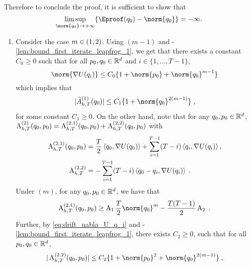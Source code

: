 Therefore to conclude the proof, it is sufficient to show that
\begin{equation}
\label{eq:drift_uhmc_minus1}
\limsup_{\norm{\q_0} \to \plusinfty} \defEnsLigne{\Eproof(\q_0) - \norm{\q_0}} = - \infty.
\end{equation}
\begin{enumerate}[label=(\alph*),leftmargin=0cm,itemindent=0.5cm,labelwidth=1.2\itemindent,labelsep=0cm,align=left]
\item Consider the case $m \in \left(1,2\right)$. Using $(m-1)$ and  -\ref{lem:bound_first_iterate_leapfrog_1}, we get that  there exists a constant $C_0 \geq 0$ such that for all $p_0,q_0 \in \mathbb{R}^d$ and $i \in \{1,\dots,T-1\}$,
  \begin{equation}
    \label{eq:drift_nabla_U_q_i}
    \norm{\nabla \F(\q_i)} \leq C_0 \{1 + \norm{\p_0} + \norm{\q_0}^{m-1}\}
  \end{equation}
  which implies that
\begin{equation}
\label{eq:bound-A-1}
|\bar{A}^{(1)}_{h,T}(\q_0)| \leq C_1 \{1 + \norm{\q_0}^{2(m-1)} \} \eqsp,
\end{equation}
for some constant $C_1 \geq 0$.  On the other hand, note that for any $q_0,p_0 \in \mathbb{R}^d$,  $\operatorname{A}^{(2)}_{h,T}(q_0,p_0) =  \operatorname{A}^{(2,1)}_{h,T}(q_0,p_0) +  \operatorname{A}^{(2,2)}_{h,T}(q_0,p_0)$ with
\begin{align}
\label{eq:definition-A-2-1}
\operatorname{A}^{(2,1)}_{h,T}(q_0,p_0) &= \frac{T}{2} \left\langle q_0, \nabla U(q_0) \right\rangle+\sum_{i=1}^{T-1}(T-i)  \left\langle q_i,\nabla U (q_i) \right\rangle, \\ 
\label{eq:definition-A-2-2}
\operatorname{A}^{(2,2)}_{h,T} &=- \sum_{i=1}^{T-1}(T-i)  \left\langle q_0-q_i,\nabla U (q_i) \right\rangle \;.
\end{align}
Under $(m)$, for any $q_0, p_0 \in \mathbb{R}^d$, we have that
\begin{equation}
\label{eq:lower-bound-A-2-1}
\operatorname{A}_{h,T}^{(2,1)}(\q_0,\p_0) \geq \constthree \frac{T}{2} \norm{\q_0}^m - \frac{T (T-1)}{2} \constfour \eqsp.
\end{equation}
Further, by \eqref{eq:drift_nabla_U_q_i} and  -\ref{lem:bound_first_iterate_leapfrog_1},  there exists  $C_2 \geq 0$, such that for all $p_0,q_0 \in \mathbb{R}^d$,
\begin{equation}
\label{eq:bound-A-2-2}
|\operatorname{A}^{(2,2)}_{h,T}(\q_0,\p_0)| \leq C_2 \{1 + \norm{p_0}^2 + \norm{\q_0}^{2(m-1)} \} \eqsp,

\end{equation}
\end{enumerate}
